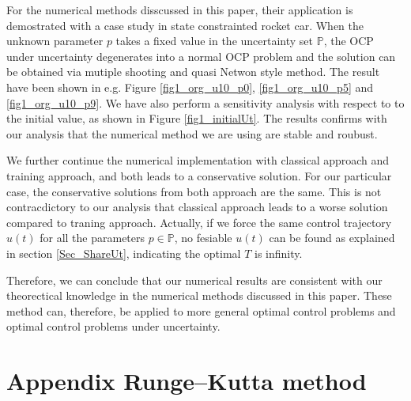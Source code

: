 \documentclass  [
  paper    = a4,
  BCOR     = 10mm,
  twoside,
  fontsize = 12pt,
  fleqn,
  toc      = bibnumbered,
  toc      = listofnumbered,
  numbers  = noendperiod,
  headings = normal,
  listof   = leveldown,
  version  = 3.03
]                                       {scrreprt}
\newcommand{\<}{\langle}
\renewcommand{\>}{\rangle}
\begin{document}
For the numerical methods disscussed in this paper, their application is demostrated with a case study in state constrainted rocket car. When the unknown parameter $p$ takes a fixed value in the uncertainty set  $\mathbb{P}$, the OCP under uncertainty degenerates into a normal OCP problem and the solution can be obtained via mutiple shooting and quasi Netwon style method. The result have been shown in e.g.  Figure  \ref{fig1_org_u10_p0},  \ref{fig1_org_u10_p5} and \ref{fig1_org_u10_p9}. We have also perform a sensitivity analysis with respect to to the initial value, as shown in Figure \ref{fig1_initialUt}. The results confirms with our analysis that the numerical method we are using are stable and roubust.


We further continue the numerical implementation with classical approach and training approach, and both leads to a conservative solution. For our particular case, the conservative solutions from both approach are  the same. This is not contracdictory to our analysis that classical approach leads to a worse solution compared to traning approach. Actually, if we force the same control trajectory $u(t)$ for all the parameters $p \in \mathbb{P}$, no fesiable $u(t)$ can be found as explained in section \ref{Sec_ShareUt}, indicating the optimal $T$ is infinity. 

Therefore, we can conclude that our numerical results are consistent with our theorectical knowledge in the numerical methods discussed in this paper. These method can, therefore, be applied to more general optimal control problems and optimal control problems under uncertainty.  
   
\appendix
\chapter{Appendix  Runge–Kutta method}
  	\label{App1}
  	
\end{document}
